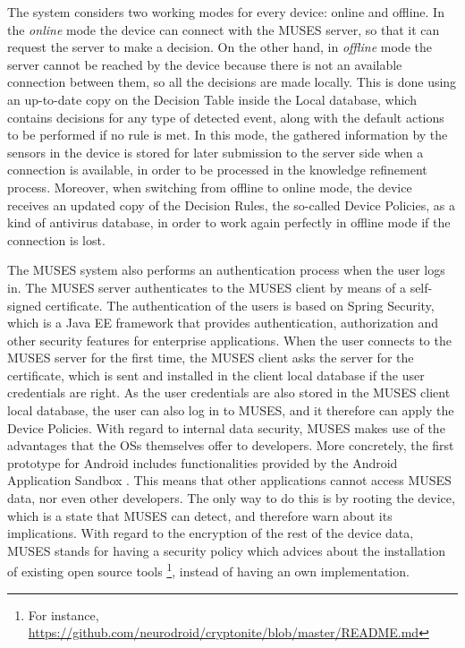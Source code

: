 The system considers two working modes for every device: online and offline. In the \textit{online} mode the device can connect with the MUSES server, so that it can request the server to make a decision. On the other hand, in \textit{offline} mode the server cannot be reached by the device because there is not an available connection between them, so all the decisions are made locally.
This is done using an up-to-date copy on the Decision Table inside the Local database, which contains decisions for any type of detected event, along with the default actions to be performed if no rule is met. In this mode, the gathered information by the sensors in the device is stored for later submission to the server side when a connection is available, in order to be processed in the knowledge refinement process.
Moreover, when switching from offline to online mode, the device receives an updated copy of the Decision Rules, the so-called Device Policies, as a kind of antivirus database, in order to work again perfectly in offline mode if the connection is lost.

The MUSES system also performs an authentication process when the user logs in. The MUSES server authenticates to the MUSES client by means of a self-signed certificate. The authentication of the users is based on Spring Security, which is a Java EE framework that provides authentication, authorization and other security features for enterprise applications. When the user connects to the MUSES server for the first time, the MUSES client asks the server for the certificate, which is sent and installed in the client local database if the user credentials are right. As the user credentials are also stored in the MUSES client local database, the user can also log in to MUSES, and it therefore can apply the Device Policies. With regard to internal data security, MUSES makes use of the advantages that the OSs themselves offer to developers. More concretely, the first prototype for Android includes functionalities provided by the Android Application Sandbox \cite{blasing2010android}. This means that other applications cannot access MUSES data, nor even other developers. The only way to do this is by rooting the device, which is a state that MUSES can detect, and therefore warn about its implications. With regard to the encryption of the rest of the device data, MUSES stands for having a security policy which advices about the installation of existing open source tools \footnote{For instance, \url{https://github.com/neurodroid/cryptonite/blob/master/README.md}}, instead of having an own implementation.

